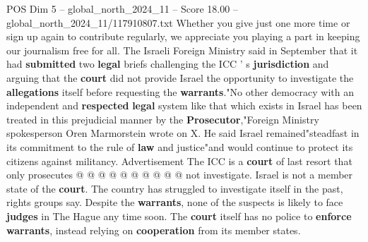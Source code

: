 \begin{textsample}{POS Dim 5 – global\_north\_2024\_11 – Score 18.00 – global\_north\_2024\_11/117910807.txt}
Whether you give just one more time or sign up again to contribute regularly, we appreciate you playing a part in keeping our journalism free for all.
The Israeli Foreign Ministry said in September that it had \textbf{submitted} two \textbf{legal} briefs challenging the ICC ' s \textbf{jurisdiction} and arguing that the \textbf{court} did not provide Israel the opportunity to investigate the \textbf{allegations} itself before requesting the \textbf{warrants}."No other democracy with an independent and \textbf{respected} \textbf{legal} system like that which exists in Israel has been treated in this prejudicial manner by the \textbf{Prosecutor},"Foreign Ministry spokesperson Oren Marmorstein wrote on X.
He said Israel remained"steadfast in its commitment to the rule of \textbf{law} and justice"and would continue to protect its citizens against militancy.
Advertisement The ICC is a \textbf{court} of last resort that only prosecutes @ @ @ @ @ @ @ @ @ @ not investigate.
Israel is not a member state of the \textbf{court}.
The country has struggled to investigate itself in the past, rights groups say.
Despite the \textbf{warrants}, none of the suspects is likely to face \textbf{judges} in The Hague any time soon.
The \textbf{court} itself has no police to \textbf{enforce} \textbf{warrants}, instead relying on \textbf{cooperation} from its member states.

\end{textsample}
